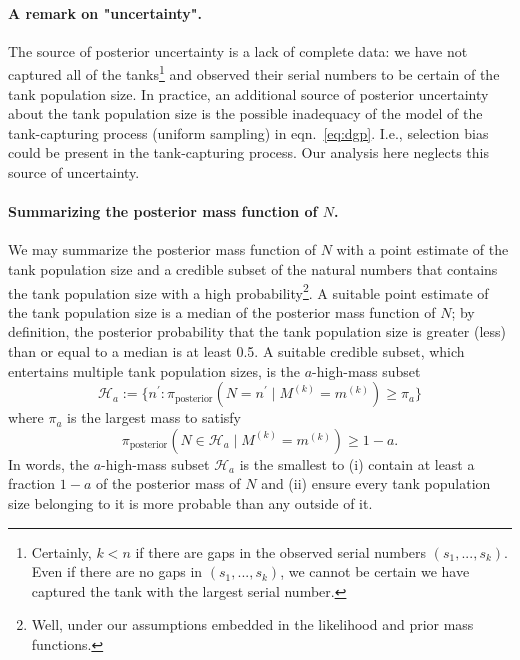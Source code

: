 \documentclass[11pt, oneside]{article}
\newcommand{\data}{$(s_1, ..., s_k)$\xspace}
\DeclareRobustCommand{\cms}[1]{ {\begingroup\sethlcolor{fruitpushorange}\hl{(cms:) #1}\endgroup} }
\begin{document}

\paragraph{A remark on "uncertainty".}
The source of posterior uncertainty is a lack of complete data: we have not captured all of the tanks\footnote{
Certainly, $k<n$ if there are gaps in the observed serial numbers \data. Even if there are no gaps in \data, we cannot be certain we have captured the tank with the largest serial number.
} and observed their serial numbers to be certain of the tank population size.
In practice, an additional source of posterior uncertainty about the tank population size is the possible inadequacy of the model of the tank-capturing process (uniform sampling) in eqn.~\ref{eq:dgp}. I.e., selection bias could be present in the tank-capturing process. Our analysis here neglects this source of uncertainty. 

\paragraph{Summarizing the posterior mass function of $N$.}
We may summarize the posterior mass function of $N$ with a point estimate of the tank population size and a credible subset of the natural numbers that contains the tank population size with a high probability\footnote{Well, under our assumptions embedded in the likelihood and prior mass functions.}.
A suitable point estimate of the tank population size is a median of the posterior mass function of $N$; by definition, the posterior probability that the tank population size is greater (less) than or equal to a median is at least 0.5.
A suitable credible subset, which entertains multiple tank population sizes, is the $a$-high-mass subset \cite{hyndman1996computing}
\begin{equation}
	\mathcal{H}_a:= \{n^\prime : \pi_{\text{posterior}}(N=n^\prime \mid M^{(k)}=m^{(k)}) \geq \pi_a\}
\end{equation} where $\pi_a$ is the largest mass to satisfy 
\begin{equation}
	\pi_{\text{posterior}}(N \in \mathcal{H}_a \mid M^{(k)}=m^{(k)}) \geq 1 - a.
\end{equation}
In words, the $a$-high-mass subset $\mathcal{H}_a$ is the smallest to (i) contain at least a fraction $1-a$ of the posterior mass of $N$ and (ii) ensure every tank population size belonging to it is more probable than any outside of it. 
\end{document}
